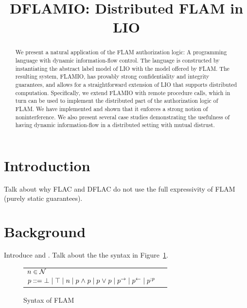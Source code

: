 \documentclass[conference]{IEEEtran}
\begin{document}
\title{DFLAMIO: Distributed FLAM in LIO}

\author{
}

\maketitle

\begin{abstract}
We present a natural application of the FLAM authorization logic: A programming language with dynamic information-flow control. The language is constructed by instantiating the abstract label model of LIO with the model offered by FLAM. The resulting system, FLAMIO, has provably strong confidentiality and integrity guarantees, and allows for a straightforward extension of LIO that supports distributed computation. Specifically, we extend FLAMIO with remote procedure calls, which in turn can be used to implement the distributed part of the authorization logic of FLAM. We have implemented \lang and shown that it enforces a strong notion of noninterference. We also present several case studies demonstrating the usefulness of having dynamic information-flow in a distributed setting with mutual distrust.
\end{abstract}


\section{Introduction}
Talk about why FLAC and DFLAC do not use the full expressivity of FLAM (purely static guarantees).

\section{Background}

Introduce \cite{Arden:2015:FA:2859845.2859998} and \cite{SRMMlio}. Talk about the the syntax in Figure~\ref{fig:flam-syntax}.

\begin{figure}[h]
    \centering
    \begin{tabular}{ll}
    $n \in \mathcal{N}$ \\
    $p ::= \bot \mid \top \mid n \mid p \mathrel{\land} p \mid p \mathrel{\lor} p \mid p^{\rightarrow} \mid p^{\leftarrow} \mid {p}^{:p}$
    \end{tabular}
    \caption{Syntax of FLAM}
    \label{fig:flam-syntax}
\end{figure}
\end{document}
